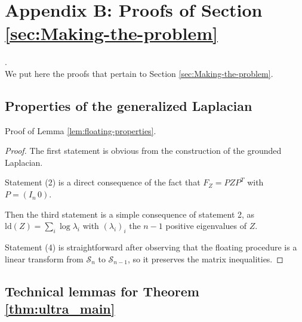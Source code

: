 
\section*{Appendix B: Proofs of Section \ref{sec:Making-the-problem}}

.\\

We put here the proofs that pertain to Section \ref{sec:Making-the-problem}.


\subsection{Properties of the generalized Laplacian}

Proof of Lemma \ref{lem:floating-properties}.
\begin{proof}
The first statement is obvious from the construction of the grounded
Laplacian.

Statement (2) is a direct consequence of the fact that $F_{Z}=PZP^{T}$
with $P=\left(I_{n}\,0\right)$.

Then the third statement is a simple consequence of statement 2, as
$\text{ld}\left(Z\right)=\sum_{i}\log\lambda_{i}$ with $\left(\lambda_{i}\right)_{i}$
the $n-1$ positive eigenvalues of $Z$.

Statement (4) is straightforward after observing that the floating
procedure is a linear transform from $\mathcal{S}_{n}$ to $\mathcal{S}_{n-1}$,
so it preserves the matrix inequalities.
\end{proof}

\subsection{Technical lemmas for Theorem \ref{thm:ultra_main}}

